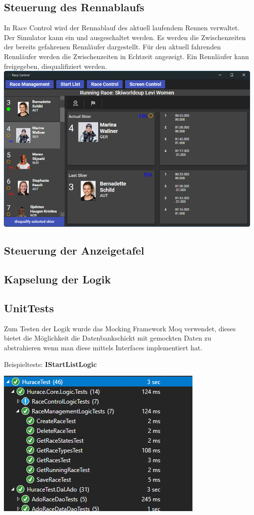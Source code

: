 \documentclass[a4paper, 12pt]{article}
\begin{document}
	\subsection{Steuerung des Rennablaufs}
	In Race Control wird der Rennablauf des aktuell laufendem Rennen verwaltet. Der Simulator kann ein und ausgeschaltet werden. Es werden die Zwischenzeiten der bereits gefahrenen Rennläufer dargestellt. Für den aktuell fahrenden Rennläufer werden die Zwischenzeiten in Echtzeit angezeigt. Ein Rennläufer kann freigegeben, disqualifiziert werden.
	\newline
	\includegraphics[width=.7\textwidth]{img/ui_raceControl.png}
	\newline
	
	
	\subsection{Steuerung der Anzeigetafel}
	
	\subsection{Kapselung der Logik}
	
	\subsection{UnitTests}
	Zum Testen der Logik wurde das Mocking Framework Moq verwendet, dieses bietet die Möglichkeit die Datenbankschickt mit gemockten Daten zu abstrahieren wenn man diese mittels Interfaces implementiert hat.
	
	Beispieltests:
	\textbf{IStartListLogic}
	
	
	
	\includegraphics[width=.7\textwidth]{img/UnitTests2.png}
\end{document}

